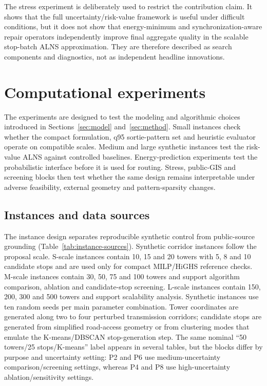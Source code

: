 The stress experiment is deliberately used to restrict the contribution claim. It shows that the full uncertainty/risk-value framework is useful under difficult conditions, but it does not show that energy-minimum and synchronization-aware repair operators independently improve final aggregate quality in the scalable stop-batch ALNS approximation. They are therefore described as search components and diagnostics, not as independent headline innovations.

\section{Computational experiments}
\label{sec:experiments}

The experiments are designed to test the modeling and algorithmic choices introduced in Sections~\ref{sec:model} and~\ref{sec:method}. Small instances check whether the compact formulation, q95 sortie-pattern set and heuristic evaluator operate on compatible scales. Medium and large synthetic instances test the risk-value ALNS against controlled baselines. Energy-prediction experiments test the probabilistic interface before it is used for routing. Stress, public-GIS and screening blocks then test whether the same design remains interpretable under adverse feasibility, external geometry and pattern-sparsity changes.

\subsection{Instances and data sources}

The instance design separates reproducible synthetic control from public-source grounding (Table~\ref{tab:instance-sources}). Synthetic corridor instances follow the proposal scale. S-scale instances contain 10, 15 and 20 towers with 5, 8 and 10 candidate stops and are used only for compact MILP/HiGHS reference checks. M-scale instances contain 30, 50, 75 and 100 towers and support algorithm comparison, ablation and candidate-stop screening. L-scale instances contain 150, 200, 300 and 500 towers and support scalability analysis. Synthetic instances use ten random seeds per main parameter combination. Tower coordinates are generated along two to four perturbed transmission corridors; candidate stops are generated from simplified road-access geometry or from clustering modes that emulate the K-means/DBSCAN stop-generation step. The same nominal ``50 towers/25 stops/K-means'' label appears in several tables, but the blocks differ by purpose and uncertainty setting: P2 and P6 use medium-uncertainty comparison/screening settings, whereas P4 and P8 use high-uncertainty ablation/sensitivity settings.

